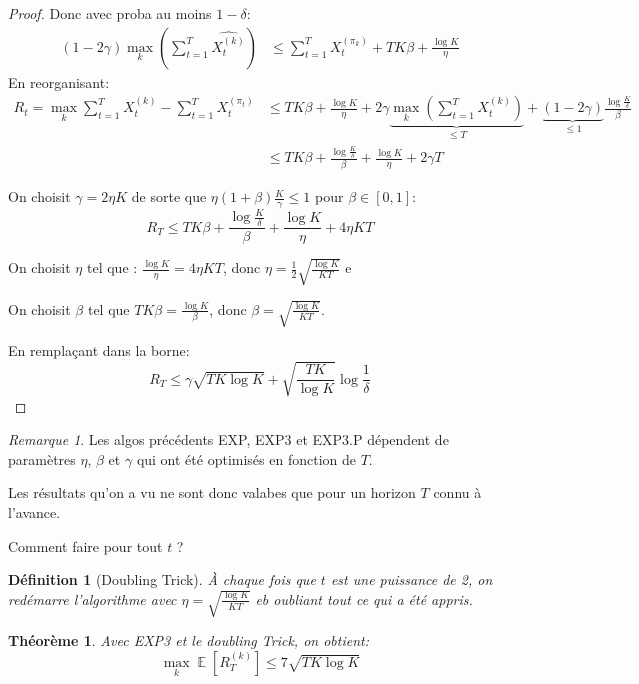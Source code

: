 \documentclass{article}
\DeclareMathOperator*{\E}{\mathbb{E}}
\newtheorem{definition}{Définition}[section]
\newtheorem{theorem}{Théorème}[section]
\theoremstyle{remark}
\theoremstyle{remark}
\newtheorem{remark}{Remarque}[section]
\begin{document}
\begin{proof}
   Donc avec proba au moins $1-\delta$:
   \begin{align*}
      (1-2\gamma) \max_k \left( \sum_{t=1}^T \widehat{X_t^{(k)}} \right) &\leq \sum_{t=1}^T X_t^{(\pi_k)} + T K \beta + \frac{\log K}{\eta}
   \end{align*}
   En reorganisant:
   \begin{align*}
      R_t = \max_k \sum_{t=1}^T X_t^{(k)} - \sum_{t=1}^T X_t^{(\pi_t)} &\leq T K \beta + \frac{\log K}{\eta} + 2 \gamma \underbrace{\max_k \left( \sum_{t=1}^T X_t^{(k)} \right)}_{\leq T} + \underbrace{(1-2 \gamma)}_{\leq 1} \frac{\log \frac K \delta}{\beta} \\
      &\leq T K \beta + \frac{\log \frac K \delta}{\beta} + \frac{\log K}{\eta} + 2 \gamma T
   \end{align*}

   On choisit $\gamma = 2 \eta K$ de sorte que $\eta (1+\beta) \frac K \gamma \leq 1$ pour $\beta \in [0,1]$:
   $$
   R_T \leq T K \beta + \frac{\log \frac K \delta}{\beta} + \frac{\log K}{\eta} + 4 \eta K T
   $$

   On choisit $\eta$ tel que : $\frac{\log K} \eta = 4 \eta K T$, donc $\eta = \frac 1 2 \sqrt{\frac{\log K}{K T}}$ e

   On choisit $\beta$ tel que $T K \beta = \frac{\log K}{\beta}$, donc $\beta = \sqrt{\frac{\log K}{K T}}$.

   En remplaçant dans la borne:
   $$
   R_T \leq \gamma \sqrt{T K \log K} + \sqrt{\frac{T K}{\log K}} \log \frac 1 \delta
   $$
\end{proof}

\begin{remark}
   Les algos précédents EXP, EXP3 et EXP3.P dépendent de paramètres $\eta$, $\beta$ et $\gamma$ qui ont été optimisés en fonction de $T$.

   Les résultats qu'on a vu ne sont donc valabes que pour un horizon $T$ connu à l'avance.

   Comment faire pour tout $t$ ?
\end{remark}

\begin{definition}[Doubling Trick]
   À chaque fois que $t$ est une puissance de 2, on redémarre l'algorithme avec $\eta = \sqrt{\frac{\log K}{K T}}$ eb oubliant tout ce qui a été appris.
\end{definition}

\begin{theorem}
   Avec EXP3 et le doubling Trick, on obtient:
   $$
   \max_k \E[R_T^{(k)}] \leq 7 \sqrt{T K \log K }
   $$
\end{theorem}
\end{document}
